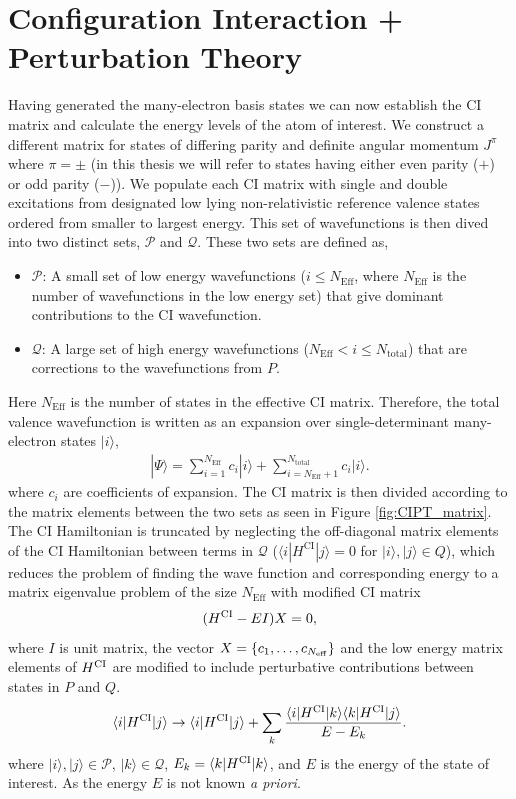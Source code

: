 \documentclass[10pt,a4paper, twoside, openright]{report}
\begin{document}
\section{Configuration Interaction + Perturbation Theory}
Having generated the many-electron basis states we can now establish the CI matrix and calculate the energy levels of the atom of interest. We construct a different matrix for states of differing parity and definite angular momentum $J^{\pi}$ where $\pi = \pm$ (in this thesis we will refer to states having either even parity ($+$) or odd parity ($-$)). We populate each CI matrix with single and double excitations from designated low lying non-relativistic reference valence states ordered from smaller to largest energy.  This set of wavefunctions is then dived into two distinct sets, $\mathcal{P}$ and $\mathcal{Q}$. These two sets are defined as,
\begin{itemize}
\item $\mathcal{P}$: A small set of low energy wavefunctions ($i \leq N_{\text{Eff}}$, where $N_{\text{Eff}}$ is the number of wavefunctions in the low energy set) that give dominant contributions to the CI wavefunction.
\item $\mathcal{Q}$: A large set of high energy wavefunctions ($N_{\text{Eff}}<i \leq N_{\text{total}}$) that are corrections to the wavefunctions from $P$.
\end{itemize}
Here $N_{\text{Eff}}$ is the number of states in the effective CI matrix. Therefore, the total valence wavefunction is written as an expansion over single-determinant many-electron states $|i \rangle $,
\begin{align*}\label{eq:psi}
| \Psi \rangle = \sum_{i=1}^{N_{\text{Eff}}} c_{i}|i\rangle + \sum_{i = N_{\text{Eff}} + 1}^{N_{\text{total}}} c_{i}|i\rangle .
\end{align*}
where $c_i$ are coefficients of expansion. The CI matrix is then divided according to the matrix elements between the two sets as seen in Figure \ref{fig:CIPT_matrix}.  The CI Hamiltonian is truncated by neglecting the off-diagonal matrix elements of the CI Hamiltonian between terms in $\mathcal{Q}$ ($\langle i | H^{\text{CI}} | j \rangle = 0 $ for $|i\rangle, |j\rangle \in Q$),  which reduces the problem of finding the wave function and corresponding energy to a matrix eigenvalue problem of the size $N_{\text{Eff}}$ with modified CI matrix
\begin{equation} \label{eq:CI}
(H^{\rm CI} - EI)X=0,
\end{equation}
where $I$ is unit matrix, the vector $X = \{c_1, \dots, c_{N_{\rm eff}}\}$ and the low energy matrix elements of $H^{\rm CI}$ are modified to include perturbative contributions between states in $P$ and $Q$.
\begin{equation}
\langle i|H^{\rm CI}|j\rangle \rightarrow \langle i|H^{\rm CI}|j\rangle + 
\sum_k \frac{\langle i|H^{\rm CI}|k\rangle\langle k|H^{\rm
    CI}|j\rangle}{E - E_k}. 
    \label{eq:HCI}
\end{equation}
where $|i\rangle, |j\rangle \in \mathcal{P}$, $|k\rangle \in \mathcal{Q}$,  $E_k = \langle k|H^{\rm CI}|k\rangle$, and $E$ is the energy of the state of interest.  As the energy $E$ is not known \textit{a priori}.
\end{document}
